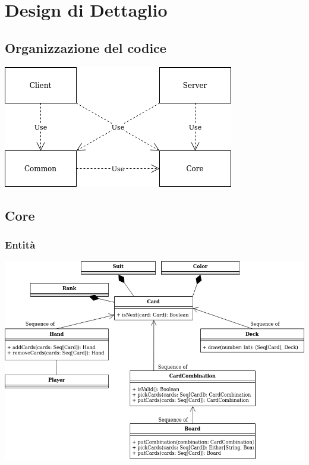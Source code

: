 \documentclass[a4paper,10pt]{article}
\begin{document}
    \newpage


    \section{Design di Dettaglio}\label{sec:design-di-dettaglio}

    \subsection{Organizzazione del codice}
    \begin{center}
        \includegraphics[scale=0.5]{moduli.png}
    \end{center}

    \subsection{Core}

    \subsubsection{Entità}
    \begin{center}
        \includegraphics[scale=0.5]{classi-Page-1.png}
    \end{center}
\end{document}
